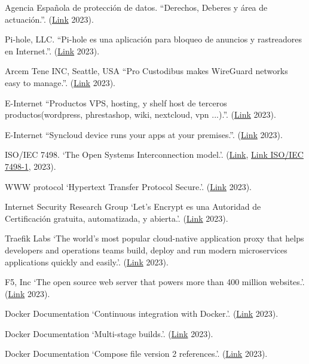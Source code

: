 \documentclass[spanish,final]{setup/eetac_tfc_pfc}
\begin{document}
\begin{thebibliography}{2}
Agencia Española de protección de datos.
``Derechos, Deberes y área de actuación.''. 
(\href{https://www.aepd.es/}{Link} 2023).

Pi-hole, LLC.
``Pi-hole es una aplicación para bloqueo de anuncios y rastreadores en Internet.''. 
(\href{https://pi-hole.net/}{Link} 2023).

Arcem Tene INC, Seattle, USA
``Pro Custodibus makes WireGuard networks easy to manage.''. 
(\href{https://www.procustodibus.com/}{Link} 2023).

E-Internet 
``Productos VPS, hosting, y shelf host de terceros productos(wordpress, phrestashop, wiki, nextcloud, vpn ...).''. 
(\href{https://tomahost.com/}{Link} 2023).

E-Internet 
``Syncloud device runs your apps at your premises.''. 
(\href{https://syncloud.org/}{Link} 2023).

ISO/IEC 7498.
`The Open Systems Interconnection model.'.
(\href{https://en.wikipedia.org/wiki/OSI_model}{Link}, \href{https://www.iso.org/standard/20269.html}{Link ISO/IEC 7498-1}, 2023).

WWW protocol
`Hypertext Transfer Protocol Secure.'.
(\href{https://en.wikipedia.org/wiki/HTTPS}{Link} 2023).

Internet Security Research Group
`Let’s Encrypt es una Autoridad de Certificación gratuita, automatizada, y abierta.'.
(\href{https://letsencrypt.org/es/}{Link} 2023).

Traefik Labs
`The world’s most popular cloud-native application proxy that helps developers and operations teams build, deploy and run modern microservices applications quickly and easily.'.
(\href{https://traefik.io/}{Link} 2023).


F5, Inc
`The open source web server that powers more than 400 million websites.'.
(\href{https://www.nginx.com/}{Link} 2023).

Docker Documentation
`Continuous integration with Docker.'.
(\href{https://docs.docker.com/build/ci/}{Link} 2023).

Docker Documentation
`Multi-stage builds.'.
(\href{https://docs.docker.com/build/building/multi-stage/}{Link} 2023).

Docker Documentation
`Compose file version 2 references.'.
(\href{https://docs.docker.com/compose/compose-file/compose-file-v2/}{Link} 2023).


\end{thebibliography}
\end{document}
